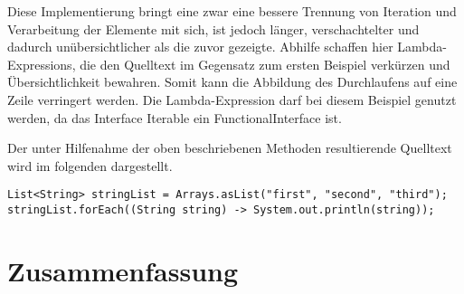 Diese Implementierung bringt eine zwar eine bessere Trennung von Iteration und
Verarbeitung der Elemente mit sich, ist jedoch länger, verschachtelter und
dadurch unübersichtlicher als die zuvor gezeigte. Abhilfe schaffen hier
Lambda-Expressions, die den Quelltext im Gegensatz zum ersten Beispiel verkürzen
und Übersichtlichkeit bewahren. Somit kann die Abbildung des Durchlaufens auf
eine Zeile verringert werden.
Die Lambda-Expression darf bei diesem Beispiel genutzt werden, da das Interface
Iterable ein FunctionalInterface ist.

Der unter Hilfenahme der oben beschriebenen Methoden resultierende Quelltext
wird im folgenden dargestellt.

\begin{lstlisting}
List<String> stringList = Arrays.asList("first", "second", "third");
stringList.forEach((String string) -> System.out.println(string));
\end{lstlisting}

\chapter{Zusammenfassung}
\label{sec:Fazit}